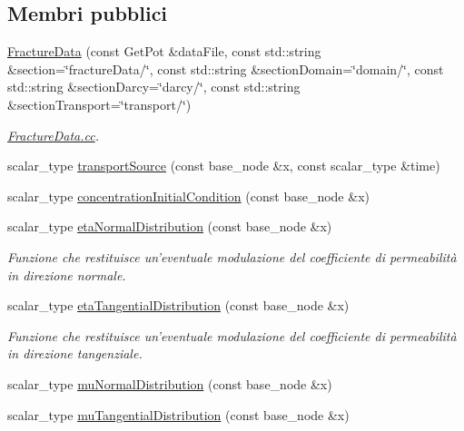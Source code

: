\subsection*{Membri pubblici}
\begin{DoxyCompactItemize}
\item 
\hyperlink{classFractureData_a8ba0cab6a95b57a37f1c965b22ed37c0}{Fracture\-Data} (const Get\-Pot \&data\-File, const std\-::string \&section=\char`\"{}fracture\-Data/\char`\"{}, const std\-::string \&section\-Domain=\char`\"{}domain/\char`\"{}, const std\-::string \&section\-Darcy=\char`\"{}darcy/\char`\"{}, const std\-::string \&section\-Transport=\char`\"{}transport/\char`\"{})
\begin{DoxyCompactList}\small\item\em \hyperlink{FractureData_8cc}{Fracture\-Data.\-cc}. \end{DoxyCompactList}\item 
scalar\-\_\-type \hyperlink{classFractureData_a31383de9b3236dd9a2af7b113cab88eb}{transport\-Source} (const base\-\_\-node \&x, const scalar\-\_\-type \&time)
\item 
scalar\-\_\-type \hyperlink{classFractureData_acf5e3a5d756aaf5b1ec7f446f388cf15}{concentration\-Initial\-Condition} (const base\-\_\-node \&x)
\item 
scalar\-\_\-type \hyperlink{classFractureData_a0aaeeb3d9eedd46175759cd6b9536484}{eta\-Normal\-Distribution} (const base\-\_\-node \&x)
\begin{DoxyCompactList}\small\item\em Funzione che restituisce un'eventuale modulazione del coefficiente di permeabilità in direzione normale. \end{DoxyCompactList}\item 
scalar\-\_\-type \hyperlink{classFractureData_a0f989b64832a1f0fc77632c6803f102c}{eta\-Tangential\-Distribution} (const base\-\_\-node \&x)
\begin{DoxyCompactList}\small\item\em Funzione che restituisce un'eventuale modulazione del coefficiente di permeabilità in direzione tangenziale. \end{DoxyCompactList}\item 
scalar\-\_\-type \hyperlink{classFractureData_a4ae566f9148893e47279097cab215e7b}{mu\-Normal\-Distribution} (const base\-\_\-node \&x)
\item 
scalar\-\_\-type \hyperlink{classFractureData_a9a3e1a75231b55be01ad198b824c0d56}{mu\-Tangential\-Distribution} (const base\-\_\-node \&x)

\end{DoxyCompactItemize}
